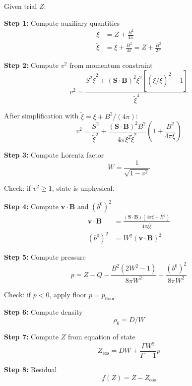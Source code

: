 \documentclass[12pt,a4paper]{article}
\begin{document}
Given trial $Z$:

\textbf{Step 1:} Compute auxiliary quantities
\begin{align}
\xi &= Z + \frac{B^2}{4\pi} \\
\tilde{\xi} &= \xi + \frac{B^2}{4\pi} = Z + \frac{B^2}{2\pi}
\end{align}

\textbf{Step 2:} Compute $v^2$ from momentum constraint
\begin{equation}
v^2 = \frac{S^2 \tilde{\xi}^2 + (\bm{S} \cdot \bm{B})^2 \xi^2 [(\tilde{\xi}/\xi)^2 - 1]}
{\tilde{\xi}^4}
\end{equation}

After simplification with $\tilde{\xi} = \xi + B^2/(4\pi)$:
\begin{equation}
v^2 = \frac{S^2}{\tilde{\xi}^2} + \frac{(\bm{S} \cdot \bm{B})^2 B^2}{4\pi \xi^2 \tilde{\xi}^2}
\left(1 + \frac{B^2}{4\pi\xi}\right)
\end{equation}

\textbf{Step 3:} Compute Lorentz factor
\begin{equation}
W = \frac{1}{\sqrt{1 - v^2}}
\end{equation}

Check: if $v^2 \geq 1$, state is unphysical.

\textbf{Step 4:} Compute $\bm{v} \cdot \bm{B}$ and $(b^0)^2$
\begin{align}
\bm{v} \cdot \bm{B} &= \frac{(\bm{S} \cdot \bm{B})(4\pi\xi + B^2)}{4\pi\xi\tilde{\xi}} \\
(b^0)^2 &= W^2 (\bm{v} \cdot \bm{B})^2
\end{align}

\textbf{Step 5:} Compute pressure
\begin{equation}
p = Z - Q - \frac{B^2(2W^2-1)}{8\pi W^2} + \frac{(b^0)^2}{8\pi W^2}
\end{equation}

Check: if $p < 0$, apply floor $p = p_\text{floor}$.

\textbf{Step 6:} Compute density
\begin{equation}
\rho_0 = D/W
\end{equation}

\textbf{Step 7:} Compute $Z$ from equation of state
\begin{equation}
Z_\text{eos} = DW + \frac{\Gamma W^2}{\Gamma-1}p
\end{equation}

\textbf{Step 8:} Residual
\begin{equation}
f(Z) = Z - Z_\text{eos}
\end{equation}
\end{document}
